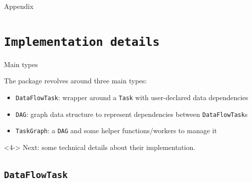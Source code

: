 \documentclass{beamer}
\begin{document}
\appendix

\begin{frame}
  \begin{center}
    \Huge Appendix
  \end{center}
\end{frame}

\section{\texttt{Implementation details}}

\begin{frame}{Main types}

The package revolves around three main types:
\begin{itemize}
  \item <1->\texttt{DataFlowTask}: wrapper around a
  \texttt{Task} with user-declared data dependencies
  \item <2->\texttt{DAG}: graph data
  structure to represent dependencies between \texttt{DataFlowTask}s
  \item <3->\texttt{TaskGraph}: a
  \texttt{DAG} and some helper functions/workers to manage it

\end{itemize}

\begin{alertblock}<4->{}
  Next: some technical details about their
  implementation.
\end{alertblock}

\end{frame}

\subsection{\texttt{DataFlowTask}}
\end{document}
